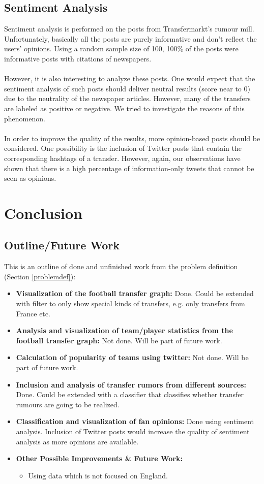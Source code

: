 \documentclass{article}
\begin{document}
\subsection{Sentiment Analysis}
\label{eval:sen}
Sentiment analysis is performed on the posts from Transfermarkt's rumour mill. Unfortunately, basically all the posts are purely informative and don't reflect the users' opinions. Using a random sample size of 100, 100\% of the posts were informative posts with citations of newspapers. 
\\ \\
However, it is also interesting to analyze these posts. One would expect that the sentiment analysis of such posts should deliver neutral results (score near to 0) due to the neutrality of the newspaper articles. However, many of the transfers are labeled as positive or negative. We tried to investigate the reasons of this phenomenon. 
\\ \\
In order to improve the quality of the results, more opinion-based posts should be considered. One possibility is the inclusion of Twitter posts that contain the corresponding hashtags of a transfer. However, again, our observations have shown that there is a high percentage of information-only tweets that cannot be seen as opinions.

\section{Conclusion}
\label{concl}
\subsection{Outline/Future Work}
This is an outline of done and unfinished work from the problem definition (Section \ref{problemdef}):

\begin{itemize}
\item \textbf{Visualization of the football transfer graph:} Done. Could be extended with filter to only show special kinds of transfers, e.g. only transfers from France etc.
\item \textbf{Analysis and visualization of team/player statistics from the football transfer graph:} Not done. Will be part of future work.
\item \textbf{Calculation of popularity of teams using twitter:} Not done. Will be part of future work.
\item \textbf{Inclusion and analysis of transfer rumors from different sources:} Done. Could be extended with a classifier that classifies whether transfer rumours are going to be realized.	
\item \textbf{Classification and visualization of fan opinions:} Done using sentiment analysis. Inclusion of Twitter posts would increase the quality of sentiment analysis as more opinions are available.
\item \textbf{Other Possible Improvements \& Future Work:}
\begin{itemize}
	\item Using data which is not focused on England. 
\end{itemize}
\end{itemize}


\end{document}
